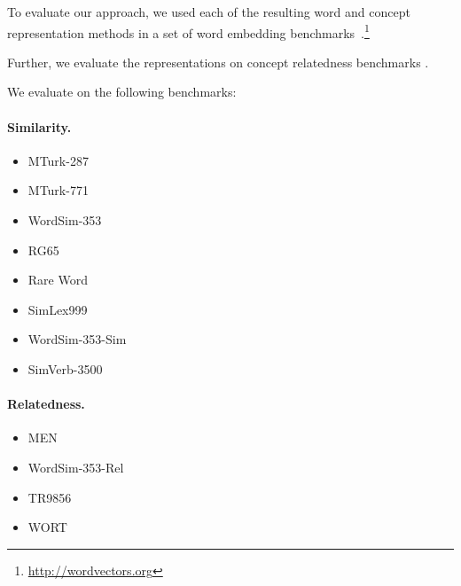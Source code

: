 \documentclass{article}
\begin{document}
    To evaluate our approach, we used each of the resulting word and concept
    representation methods in a set of word embedding
    benchmarks~\cite{faruqui-2014:SystemDemo}.\footnote{\url{http://wordvectors.org}}
    
    Further, we evaluate the representations on concept relatedness benchmarks
\cite{levy2015tr9856,eindor2018semantic}.
    
    We evaluate on the following benchmarks:
    
    \paragraph{Similarity.}
    
    \begin{itemize}
        \item MTurk-287~\cite{radinsky2011word}
        \item MTurk-771~\cite{halawi2012large}
        \item WordSim-353~\cite{finkelstein2001placing}
        \item RG65~\cite{rubenstein1965contextual}
        \item Rare Word~\cite{luong2013better}
        \item SimLex999~\cite{hill2015simlex}
        \item WordSim-353-Sim~\cite{agirre2009study}
        \item SimVerb-3500~\cite{Gerz2016emnlp}
    \end{itemize}
    
    \paragraph{Relatedness.}
    
    \begin{itemize}
        \item MEN~\cite{bruni2012distributional}
        \item WordSim-353-Rel~\cite{zesch2008using}
        \item TR9856~\cite{levy2015tr9856}
        \item WORT~\cite{eindor2018semantic}
    \end{itemize}
    
\end{document}
